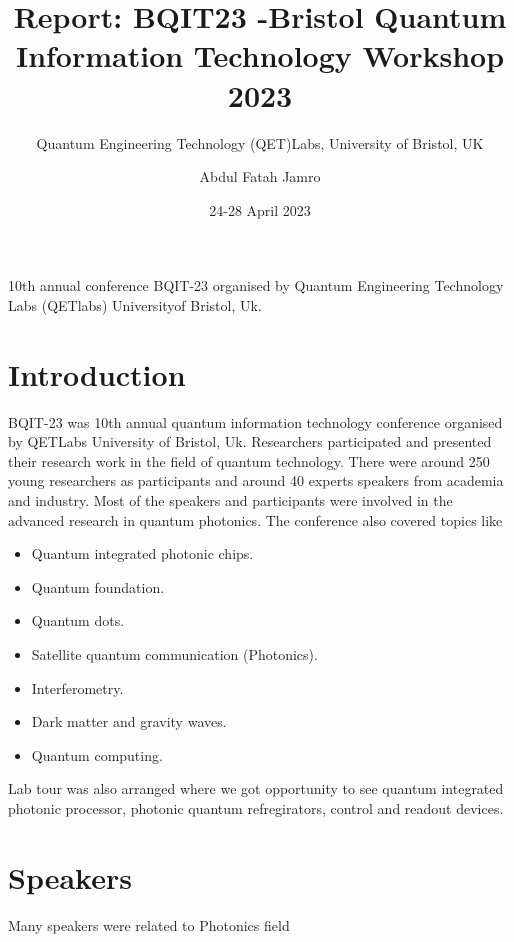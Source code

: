 \documentclass[a4paper, 12pt]{scrartcl}
\title{Report: BQIT23 -Bristol Quantum Information Technology Workshop 2023}
\subtitle{Quantum Engineering Technology (QET)Labs, University of Bristol, UK}
\author{Abdul Fatah Jamro}
\date{24-28 April 2023 }
\begin{document}
\maketitle
  10th annual conference BQIT-23 organised by Quantum Engineering Technology
  Labs (QETlabs) Universityof Bristol, Uk.

\section{Introduction}
  BQIT-23 was 10th annual quantum information technology conference organised 
  by QETLabs University of Bristol, Uk. Researchers participated and presented 
  their research work in the field of quantum technology. There were around 250
  young researchers as participants and around 40 experts speakers from academia and industry.
  Most of the speakers and participants were involved in the advanced research in quantum photonics. 
  The conference also covered topics like 

\begin{itemize}
  \item Quantum integrated photonic chips.
  \item Quantum foundation.
  \item Quantum dots.
  \item Satellite quantum communication (Photonics).
  \item Interferometry.
  \item Dark matter and gravity waves.
  \item Quantum computing.
\end{itemize}

Lab tour was also arranged where we got opportunity to see quantum integrated photonic processor,
photonic quantum refregirators, control and readout devices.

\section{Speakers}
  Many speakers were related to Photonics field 
\end{document}
